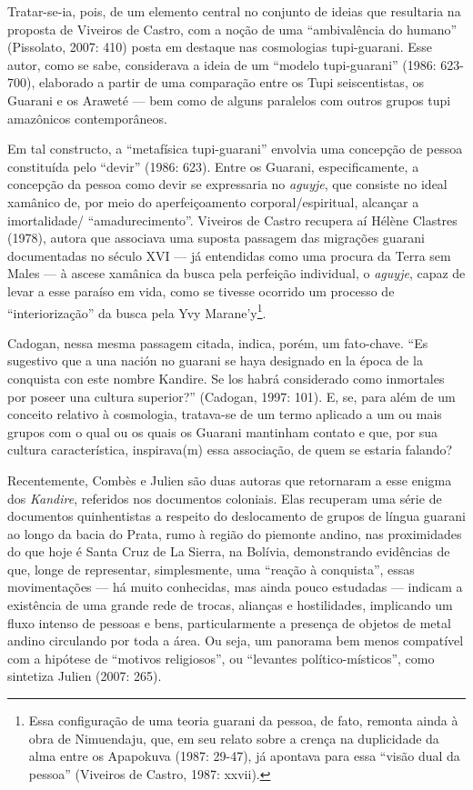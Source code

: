 Tratar-se-ia, pois, de um elemento central no conjunto de ideias que
resultaria na proposta de Viveiros de Castro, com a noção de uma
``ambivalência do humano'' (Pissolato, 2007: 410) posta em destaque nas
cosmologias tupi-guarani. Esse autor, como se sabe, considerava a ideia
de um ``modelo tupi-guarani'' (1986: 623-700), elaborado a partir de uma
comparação entre os Tupi seiscentistas, os Guarani e os Araweté --- bem
como de alguns paralelos com outros grupos tupi amazônicos
contemporâneos.

Em tal constructo, a ``metafísica tupi-guarani'' envolvia uma concepção
de pessoa constituída pelo ``devir'' (1986: 623). Entre os Guarani,
especificamente, a concepção da pessoa como devir se expressaria no
\emph{aguyje}, que consiste no ideal xamânico de, por meio do
aperfeiçoamento corporal/espiritual, alcançar a imortalidade/
``amadurecimento''. Viveiros de Castro recupera aí Hélène Clastres
(1978), autora que associava uma suposta passagem das migrações guarani
documentadas no século XVI --- já entendidas como uma procura da Terra
sem Males --- à ascese xamânica da busca pela perfeição individual, o
\emph{aguyje}, capaz de levar a esse paraíso em vida, como se tivesse
ocorrido um processo de ``interiorização'' da busca pela Yvy
Marane'y\footnote{Essa configuração de uma teoria guarani da pessoa, de
  fato, remonta ainda à obra de Nimuendaju, que, em seu relato sobre a
  crença na duplicidade da alma entre os Apapokuva (1987: 29-47), já
  apontava para essa ``visão dual da pessoa'' (Viveiros de Castro, 1987:
  xxvii).}.

Cadogan, nessa mesma passagem citada, indica, porém, um fato-chave. ``Es
sugestivo que a una nación no guarani se haya designado en la época de
la conquista con este nombre Kandire. Se los habrá considerado como
inmortales por poseer una cultura superior?'' (Cadogan, 1997: 101). E,
se, para além de um conceito relativo à cosmologia, tratava-se de um
termo aplicado a um ou mais grupos com o qual ou os quais os Guarani
mantinham contato e que, por sua cultura característica, inspirava(m)
essa associação, de quem se estaria falando?

Recentemente, Combès e Julien são duas autoras que retornaram a esse
enigma dos \emph{Kandire}, referidos nos documentos coloniais. Elas
recuperam uma série de documentos quinhentistas a respeito do
deslocamento de grupos de língua guarani ao longo da bacia do Prata,
rumo à região do piemonte andino, nas proximidades do que hoje é Santa
Cruz de La Sierra, na Bolívia, demonstrando evidências de que, longe de
representar, simplesmente, uma ``reação à conquista'', essas
movimentações --- há muito conhecidas, mas ainda pouco estudadas ---
indicam a existência de uma grande rede de trocas, alianças e
hostilidades, implicando um fluxo intenso de pessoas e bens,
particularmente a presença de objetos de metal andino circulando por
toda a área. Ou seja, um panorama bem menos compatível com a hipótese de
``motivos religiosos'', ou ``levantes político-místicos'', como
sintetiza Julien (2007: 265).

